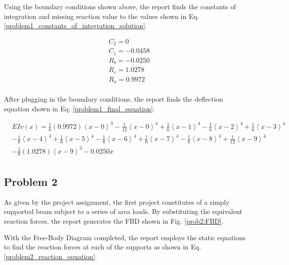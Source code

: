 \documentclass[a4paper]{article}
\begin{document}
Using the boundary conditions shown above, the report finds the constants of integration and missing reaction value to the values shown in Eq. \ref{problem1_constants_of_integration_solution}.

\begin{equation}
\begin{split}
	& C_2 = 0 \\
	& C_1 = - 0.0458 \\
	& R_b = - 0.0250\\
	& R_c = 1.0278\\
	& R_a = 0.9972 \\
\end{split}
\label{problem1_constants_of_integration_solution}
\end{equation}

After plugging in the boundary conditions, the report finds the deflection equation shown in Eq. \ref{problem1_final_equation}.

\begin{equation}
\begin{split}
  & EI v(x) = \frac{1}{6}\left(0.9972\right)\left<x-0\right>^3 - \frac{1}{12}\left<x-0\right>^4 +  \frac{1}{6}\left<x-1\right>^4 - \frac{1}{6}\left<x-2\right>^4 + \frac{1}{6}\left<x-3\right>^4   \\      
& - \frac{1}{6}\left<x-4\right>^4 +  \frac{1}{6}\left<x-5\right>^4 - \frac{1}{6}\left<x-6\right>^4  +  \frac{1}{6}\left<x-7\right>^4 - \frac{1}{6}\left<x-8\right>^4 +  \frac{1}{12}\left<x-9\right>^4  \\
& - \frac{1}{6}\left(1.0278\right)\left<x-9\right>^3 - 0.0250x \\
\end{split}
\label{problem1_final_equation}
\end{equation}



\subsection{Problem 2}

As given by the project assignment, the first project constitutes of a simply supported beam subject to a series of area loads. By substituting the equivalent reaction forces, the report generates the FBD shown in Fig. \ref{prob2:FBD}.

With the Free-Body Diagram completed, the report employs the static equations to find the reaction forces at each of the supports as shown in Eq. \ref{problem2_reaction_equation}.
\end{document}
